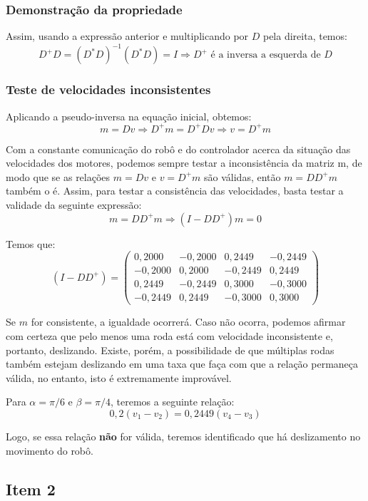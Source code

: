 \documentclass{article}
\begin{document}
\subsubsection{Demonstração da propriedade}

\hspace{1cm} Assim, usando a expressão anterior e multiplicando por $D$ pela direita, temos:
\[D^+D = (D^*D)^{-1}(D^*D) = I \Rightarrow D^+ \text{ é a inversa a esquerda de }D\]  

\subsubsection{Teste de velocidades inconsistentes}

\hspace{1cm} Aplicando a pseudo-inversa na equação inicial, obtemos:
\[ m = Dv \Rightarrow D^+m = D^+Dv \Rightarrow v = D^+m\]

Com a constante comunicação do robô e do controlador acerca da situação das velocidades dos motores, podemos sempre testar a inconsistência da matriz m, de modo que se as relações $m = Dv$ e $v = D^+m$ são válidas, então $m = DD^+m$ também o é. Assim, para testar a consistência das velocidades, basta testar a validade da seguinte expressão:
\[ m = DD^+m \Rightarrow (I - DD^+)m = 0\]

Temos que:
\[(I - DD^+)
=
\begin{pmatrix}
  0,2000    &-0,2000    & 0,2449    & -0,2449    \\
 -0,2000 &  0,2000 & -0,2449 & 0,2449 \\
 0,2449 & -0,2449 &  0,3000  & -0,3000 \\
 -0,2449 & 0,2449 & -0,3000  & 0,3000
 \end{pmatrix}
\]


Se $m$ for consistente, a igualdade ocorrerá. Caso não ocorra, podemos afirmar com certeza que pelo menos uma roda está com velocidade inconsistente e, portanto, deslizando. Existe, porém, a possibilidade de que múltiplas rodas também estejam deslizando em uma taxa que faça com que a relação permaneça válida, no entanto, isto é extremamente improvável.

Para $\alpha = \pi/6$ e $\beta = \pi/4$, teremos a seguinte relação:
\[0,2(v_1 - v_2) = 0,2449(v_4 - v_3)\]

Logo, se essa relação \textbf{não} for válida, teremos identificado que há deslizamento no movimento do robô.

\subsection{Item 2}
\end{document}
